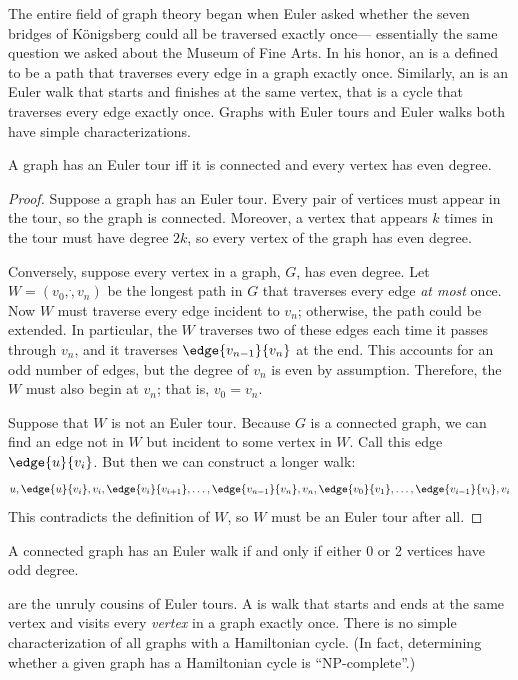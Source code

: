 The entire field of graph theory began when Euler asked whether the seven
bridges of K\"onigsberg could all be traversed exactly once--- essentially
the same question we asked about the Museum of Fine Arts.  In his honor,
an  is a defined to be a path that traverses every edge
in a graph exactly once.  Similarly, an  is an Euler walk
that starts and finishes at the same vertex, that is a cycle that
traverses every edge exactly once.  Graphs with Euler tours and Euler
walks both have simple characterizations.

\begin{theorem}
A graph has an Euler tour iff it is connected and every vertex has even
degree.
\end{theorem}

\begin{proof}
Suppose a graph has an Euler tour.  Every pair of vertices must appear in
the tour, so the graph is connected.  Moreover, a vertex that appears $k$
times in the tour must have degree $2k$, so every vertex of the graph has
even degree.


Conversely, suppose every vertex in a graph, $G$, has even degree.  Let $W
= (v_0,\dot,v_n)$ be the longest path in $G$ that traverses every edge
\textit{at most} once.  Now $W$ must traverse every edge incident to
$v_n$; otherwise, the path could be extended.  In particular, the $W$
traverses two of these edges each time it passes through $v_n$, and it
traverses $\edge{v_{n-1}}{v_n}$ at the end.  This accounts for an odd
number of edges, but the degree of $v_n$ is even by assumption.
Therefore, the $W$ must also begin at $v_n$; that is, $v_0 = v_n$.

Suppose that $W$ is not an Euler tour.  Because $G$ is a connected
graph, we can find an edge not in $W$ but incident to some vertex in
$W$.  Call this edge $\edge{u}{v_i}$.  But then we can construct a
longer walk:
%
\[
u, \edge{u}{v_i}, v_i, \edge{v_i}{v_{i+1}}, 
\dots, 
\edge{v_{n-1}}{v_n}, v_n, \edge{v_0}{v_1}, 
\dots, 
\edge{v_{i-1}}{v_i}, v_i
\]
%
This contradicts the definition of $W$, so $W$ must be an
Euler tour after all.
\end{proof}

\begin{corollary}
A connected graph has an Euler walk if and only if either 0 or 2
vertices have odd degree.
\end{corollary}

 are the unruly cousins of Euler tours.  A
 is walk that starts and ends at the same
vertex and visits every \textit{vertex} in a graph exactly once.
There is no simple characterization of all graphs with a Hamiltonian
cycle.  (In fact, determining whether a given graph has a Hamiltonian
cycle is ``NP-complete''.)
\fi


\endinput

